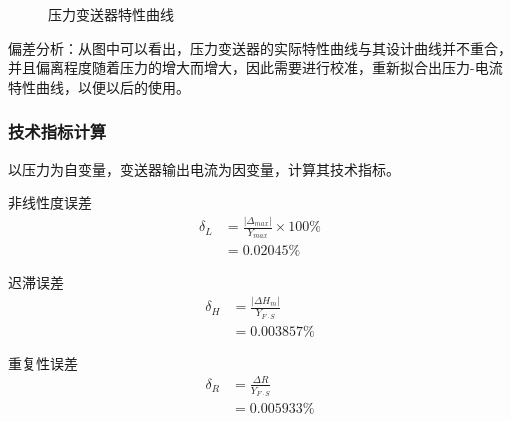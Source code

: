 \documentclass[UTF8]{article}
\begin{document}
	\begin{figure}[htbp]
		\centering
		
		
		
		\centering
		\caption{压力变送器特性曲线}
		\vspace{-0.2cm}
		\label{fig:compare_fig}
	\end{figure}

偏差分析：从图中可以看出，压力变送器的实际特性曲线与其设计曲线并不重合，并且偏离程度随着压力的增大而增大，因此需要进行校准，重新拟合出压力-电流特性曲线，以便以后的使用。

	\subsubsection{技术指标计算}
	以压力为自变量，变送器输出电流为因变量，计算其技术指标。
	
	非线性度误差
	\begin{equation}
	\begin{split}
	\delta_{L} &= \frac{|\Delta_{max}|}{Y_{max}}\times 100\% \\
	&= 0.02045\%
	\end{split}
	\end{equation}
	
	迟滞误差
	\begin{equation}
		\begin{split}
		\delta_{H} &=\frac{|\Delta H_{m}|}{Y_{F\cdot S}} \\&=  0.003857\% 
		\end{split}
	\end{equation}
	
	重复性误差
	\begin{equation}
	\begin{split}
		\delta_{R} &=\frac{\Delta R}{Y_{F\cdot S}} \\&= 0.005933\%
	\end{split}
	\end{equation}
\end{document}
